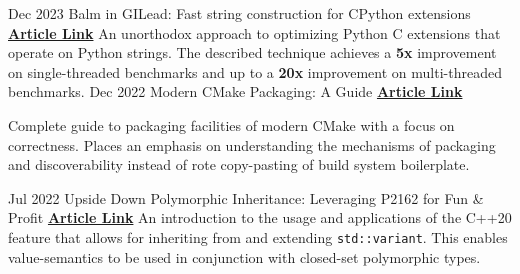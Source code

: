 \documentclass[9pt]{developercv} %
\begin{document}
\vspace{-10 pt}
\begin{entrylist}
	\entry
	{Dec 2023}
	{Balm in GILead: Fast string construction for CPython extensions}
	{
		{\href{https://blog.vito.nyc/posts/gil-balm}{\textbf{Article Link}}}
	}
	{
		An unorthodox approach to optimizing Python C extensions that operate on
		Python strings. The described technique achieves a \textbf{5x} improvement
		on single-threaded benchmarks and up to a \textbf{20x} improvement on
		multi-threaded benchmarks.
	}
	\entry
	{Dec 2022}
	{Modern CMake Packaging: A Guide}
	{
		{\href{https://blog.vito.nyc/posts/cmake-pkg}{\textbf{Article Link}}}
	}
	{
		Complete guide to packaging facilities of modern CMake with a focus on
		correctness. Places an emphasis on understanding the mechanisms of
		packaging and discoverability instead of rote copy-pasting of build system
		boilerplate.

	}
	\entry
	{Jul 2022}
	{Upside Down Polymorphic Inheritance: Leveraging P2162 for Fun \& Profit}
	{
		{\href{https://blog.vito.nyc/posts/p2162}{\textbf{Article Link}}}
	}
	{
		An introduction to the usage and applications of the C++20 feature that
		allows for inheriting from and extending \texttt{std::variant}. This enables value-semantics to be used in conjunction with closed-set polymorphic types.
	}
\end{entrylist}

\end{document}
